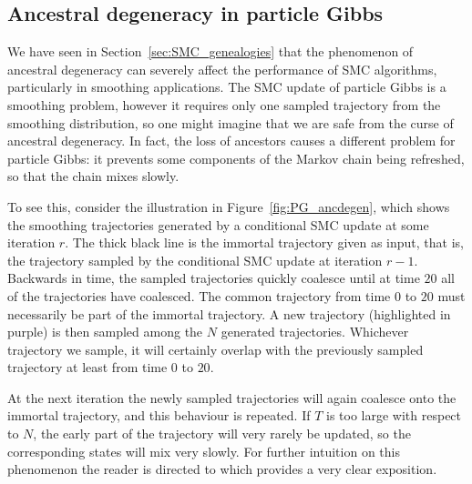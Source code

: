 \subsection{Ancestral degeneracy in particle Gibbs}
We have seen in Section~\ref{sec:SMC_genealogies} that the phenomenon of ancestral degeneracy can severely affect the performance of SMC algorithms, particularly in smoothing applications.
The SMC update of particle Gibbs is a smoothing problem, however it requires only one sampled trajectory from the smoothing distribution, so one might imagine that we are safe from the curse of ancestral degeneracy.
In fact, the loss of ancestors causes a different problem for particle Gibbs: it prevents some components of the Markov chain being refreshed, so that the chain mixes slowly.

To see this, consider the illustration in Figure~\ref{fig:PG_ancdegen}, which shows the smoothing trajectories generated by a conditional SMC update at some iteration $r$. The thick black line is the immortal trajectory given as input, that is, the trajectory sampled by the conditional SMC update at iteration $r-1$. Backwards in time, the sampled trajectories quickly coalesce until at time $20$ all of the trajectories have coalesced. The common trajectory from time $0$ to $20$ must necessarily be part of the immortal trajectory.
A new trajectory (highlighted in purple) is then sampled among the $N$ generated trajectories. Whichever trajectory we sample, it will certainly overlap with the previously sampled trajectory at least from time $0$ to $20$.

At the next iteration the newly sampled trajectories will again coalesce onto the immortal trajectory, and this behaviour is repeated. 
If $T$ is too large with respect to $N$, the early part of the trajectory will very rarely be updated, so the corresponding states will mix very slowly.
For further intuition on this phenomenon the reader is directed to \textcite[Section 5.4]{lindsten2013} which provides a very clear exposition.

